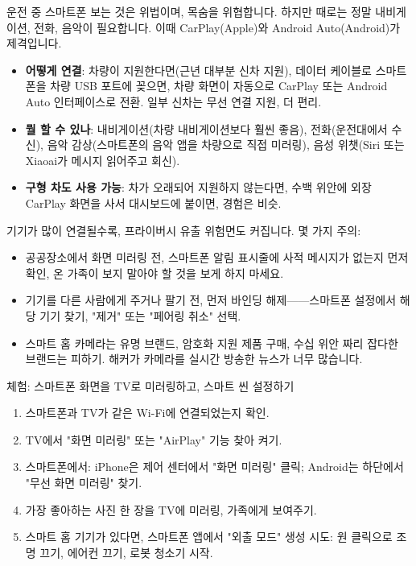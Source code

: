 
운전 중 스마트폰 보는 것은 위법이며, 목숨을 위협합니다. 하지만 때로는 정말 내비게이션, 전화, 음악이 필요합니다. 이때 CarPlay(Apple)와 Android Auto(Android)가 제격입니다.

\begin{itemize}
  \item \textbf{어떻게 연결}: 차량이 지원한다면(근년 대부분 신차 지원), 데이터 케이블로 스마트폰을 차량 USB 포트에 꽂으면, 차량 화면이 자동으로 CarPlay 또는 Android Auto 인터페이스로 전환. 일부 신차는 무선 연결 지원, 더 편리.
  \item \textbf{뭘 할 수 있나}: 내비게이션(차량 내비게이션보다 훨씬 좋음), 전화(운전대에서 수신), 음악 감상(스마트폰의 음악 앱을 차량으로 직접 미러링), 음성 위챗(Siri 또는 Xiaoai가 메시지 읽어주고 회신).
  \item \textbf{구형 차도 사용 가능}: 차가 오래되어 지원하지 않는다면, 수백 위안에 외장 CarPlay 화면을 사서 대시보드에 붙이면, 경험은 비슷.
\end{itemize}


기기가 많이 연결될수록, 프라이버시 유출 위험면도 커집니다. 몇 가지 주의:

\begin{itemize}
  \item 공공장소에서 화면 미러링 전, 스마트폰 알림 표시줄에 사적 메시지가 없는지 먼저 확인, 온 가족이 보지 말아야 할 것을 보게 하지 마세요.
  \item 기기를 다른 사람에게 주거나 팔기 전, 먼저 바인딩 해제——스마트폰 설정에서 해당 기기 찾기, "제거" 또는 "페어링 취소" 선택.
  \item 스마트 홈 카메라는 유명 브랜드, 암호화 지원 제품 구매, 수십 위안 짜리 잡다한 브랜드는 피하기. 해커가 카메라를 실시간 방송한 뉴스가 너무 많습니다.
\end{itemize}

\begin{tcbpractice}{체험: 스마트폰 화면을 TV로 미러링하고, 스마트 씬 설정하기}
\begin{enumerate}
  \item 스마트폰과 TV가 같은 Wi-Fi에 연결되었는지 확인.
  \item TV에서 "화면 미러링" 또는 "AirPlay" 기능 찾아 켜기.
  \item 스마트폰에서: iPhone은 제어 센터에서 "화면 미러링" 클릭; Android는 하단에서 "무선 화면 미러링" 찾기.
  \item 가장 좋아하는 사진 한 장을 TV에 미러링, 가족에게 보여주기.
  \item 스마트 홈 기기가 있다면, 스마트폰 앱에서 "외출 모드" 생성 시도: 원 클릭으로 조명 끄기, 에어컨 끄기, 로봇 청소기 시작.
\end{enumerate}

\end{tcbpractice}

